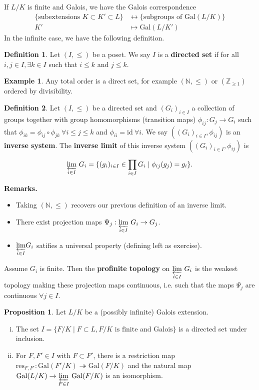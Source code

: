 \documentclass{article}
\theoremstyle{definition}
\newtheorem{prop}[theorem]{Proposition}
\newtheorem{example}{Example}[section]
\newtheorem{defn}{Definition}[section]
\begin{document}
If $L/K$ is finite and Galois, we have the Galois correspondence \begin{align*}
    \{\text{subextensions }K\subset K' \subset L\} &\leftrightarrow \{\text{subgroups of }\text{Gal}(L/K)\}\\
    K' &\mapsto \text{Gal}(L/K')
\end{align*}
In the infinite case, we have the following definition.
\begin{defn}
    Let $(I,\le )$ be a poset. We say $I$ is a \textbf{directed set} if for all $i, j \in I, \exists k \in I$ such that $i\le k$ and $j\le k$.
\end{defn}
\begin{example}
    Any total order is a direct set, for example $(\mathbb{N},\le)$ or $(\mathbb{Z}_{\ge 1})$ ordered by divisibility.
\end{example}
\begin{defn}
    Let $(I, \le )$ be a directed set and $(G_i)_{i \in I}$ a collection of groups together with group homomorphisms (transition maps) $\phi_{ij} : G_j \to G_i$ such that $\phi_{ik} = \phi_{ij} \circ \phi_{jk} ~\forall i\le j\le k$ and $\phi_{ii} = \text{id} ~\forall i$. We say $((G_i)_{i \in I}, \phi_{ij})$ is an \textbf{inverse system}. The \textbf{inverse limit} of this inverse system $((G_i)_{i \in I}, \phi_{ij})$ is 
    \begin{align*}
        \underset{i \in I}{\varprojlim}~ G_i = \{(g_i)_{i \in I} \in \prod_{i \in I}^{} G_i \mid \phi_{ij}(g_j) = g_i \}.
    \end{align*}
\end{defn}
\textbf{Remarks.} 
\begin{itemize}
    \item Taking $(\mathbb{N}, \le )$ recovers our previous definition of an inverse limit.
    \item There exist projection maps $\Psi_j : \underset{i \in I}{\varprojlim}~ G_i \to G_j$.
    \item $\underset{i \in I}{\varprojlim} G_i$ satifies a universal property (defining left as exercise).
\end{itemize}
Assume $G_i$ is finite. Then the \textbf{profinite topology} on $\underset{i \in I}{\varprojlim}~ G_i$ is the weakest topology making these projection maps continuous, i.e. such that the maps $\Psi_j$ are continuous $\forall j \in I$.
\begin{prop}\label{prop16.1}
    Let $L/K$ be a (possibly infinite) Galois extension.
    \begin{enumerate}[(i)]
        \item The set $I = \{F/K \mid F \subset L, F/K \text{ is finite and Galois}\}$ is a directed set under inclusion.
        \item For $F,F' \in I$ with $F \subset F'$, there is a restriction map $\text{res}_{F,F'}: \text{Gal}(F'/K) \twoheadrightarrow \text{Gal}(F/K)$ and the natural map $\text{Gal}(L/K) \to \underset{F \in I}{\varprojlim} ~ \text{Gal}(F/K)$ is an isomorphism.
    \end{enumerate}
\end{prop}
\end{document}
